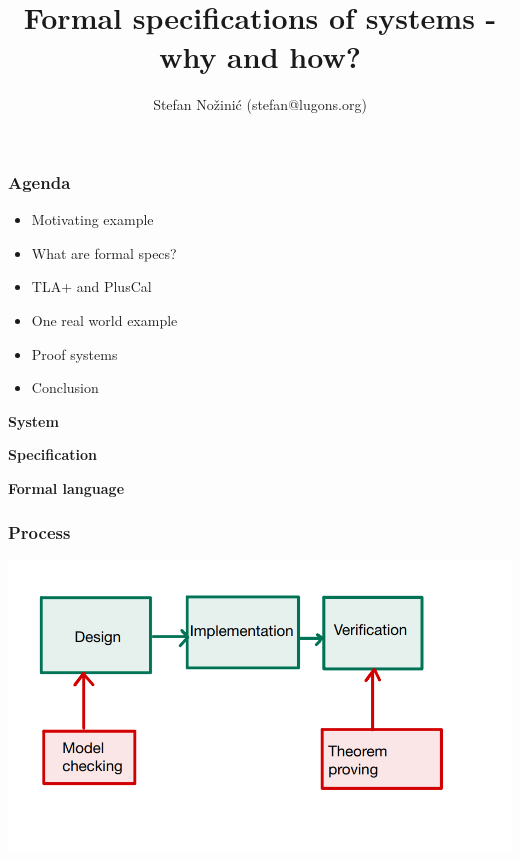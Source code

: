 \documentclass{beamer}
\begin{document}
\title{Formal specifications of systems - why and how?}
\author{Stefan Nožinić (stefan@lugons.org)}

\frame{
\titlepage
}

\begin{frame}
    \frametitle{Agenda}
    \begin{itemize}
        \item Motivating example
        \item What are formal specs? 
        \item TLA+ and PlusCal
        \item One real world example
        \item Proof systems 
        \item Conclusion
    \end{itemize}

\end{frame}


\begin{frame}
    \begin{center}
        \LARGE{\textbf{System}}
    \end{center}
\end{frame}



\begin{frame}
    \begin{center}
        \LARGE{\textbf{Specification}}
    \end{center}
\end{frame}



\begin{frame}
    \begin{center}
        \LARGE{\textbf{Formal language}}
    \end{center}
\end{frame}

\begin{frame}
    \frametitle{Process}
    \includegraphics[width=\textwidth]{img/2.png}
\end{frame}
\end{document}
